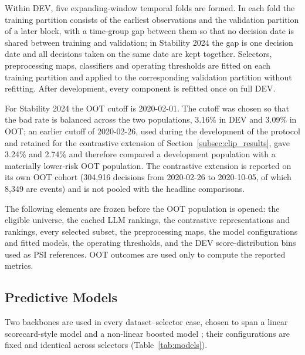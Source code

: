 \documentclass[preprint,12pt]{elsarticle}
\begin{document}
Within DEV, five expanding-window temporal folds are formed. In each fold the training partition consists of the earliest observations and the validation partition of a later block, with a time-group gap between them so that no decision date is shared between training and validation; in Stability 2024 the gap is one decision date and all decisions taken on the same date are kept together. Selectors, preprocessing maps, classifiers and operating thresholds are fitted on each training partition and applied to the corresponding validation partition without refitting. After development, every component is refitted once on full DEV.

For Stability 2024 the OOT cutoff is 2020-02-01. The cutoff was chosen so that the bad rate is balanced across the two populations, 3.16\% in DEV and 3.09\% in OOT; an earlier cutoff of 2020-02-26, used during the development of the protocol and retained for the contrastive extension of Section~\ref{subsec:clip_results}, gave 3.24\% and 2.74\% and therefore compared a development population with a materially lower-risk OOT population. The contrastive extension is reported on its own OOT cohort (304,916 decisions from 2020-02-26 to 2020-10-05, of which 8,349 are events) and is not pooled with the headline comparisons.

The following elements are frozen before the OOT population is opened: the eligible universe, the cached LLM rankings, the contrastive representations and rankings, every selected subset, the preprocessing maps, the model configurations and fitted models, the operating thresholds, and the DEV score-distribution bins used as PSI references. OOT outcomes are used only to compute the reported metrics.

\subsection{Predictive Models}
\label{subsec:models}

Two backbones are used in every dataset--selector case, chosen to span a linear scorecard-style model and a non-linear boosted model \cite{lessmann2015,gunnarsson2021}; their configurations are fixed and identical across selectors (Table~\ref{tab:models}).
\end{document}

